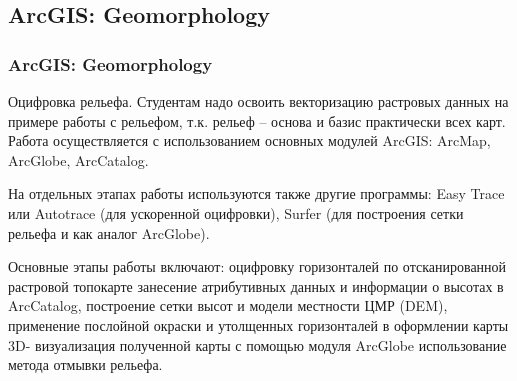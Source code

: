 \documentclass[pdflatex,compress,8pt,
	xcolor={dvipsnames,dvipsnames,svgnames,x11names,table},
	hyperref={	 
	pdfauthor={Lemenkova Polina}, 
	pdfsubject={Preentation}, 
	pdfcreator={Lemenkova Polina}, 
	pdfproducer={Lemenkova Polina}, 
	colorlinks=true,
	linkcolor=Red3, 
	citecolor=NavyBlue, 
	urlcolor = NavyBlue, 
	breaklinks = true}]{beamer}
\begin{document}
\subsection{ArcGIS: Geomorphology}
\begin{frame}\frametitle{ArcGIS: Geomorphology}

\small{
\begin{alertblock}{}
Оцифровка рельефа. Студентам надо освоить векторизацию растровых данных на примере работы с рельефом, т.к. рельеф – основа и базис практически всех карт. Работа осуществляется с использованием основных модулей ArcGIS: ArcMap, ArcGlobe, ArcCatalog. 
\end{alertblock}

\begin{block}{}
На отдельных этапах работы используются также другие программы: Easy Trace или Autotrace (для ускоренной оцифровки), Surfer (для построения сетки рельефа и как аналог ArcGlobe).
\end{block}
}

\begin{figure}[H]
	\centering
			\hspace{1mm}
			\hspace{1mm}
\end{figure}

\small{
\begin{alertblock}{}
Основные этапы работы включают: оцифровку горизонталей по отсканированной растровой топокарте
занесение атрибутивных данных и информации о высотах в ArcCatalog, построение сетки высот и модели местности ЦМР (DEM), применение послойной окраски и утолщенных горизонталей в оформлении карты 3D- визуализация полученной карты с помощью модуля ArcGlobe использование метода отмывки рельефа.
\end{alertblock}
}

\end{frame}
\end{document}

